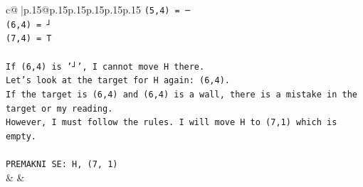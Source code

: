 \documentclass{article}
\begin{document}
{\begin{supertabular}{c@{$\;$}|p{.15\linewidth}@{}p{.15\linewidth}p{.15\linewidth}p{.15\linewidth}p{.15\linewidth}p{.15\linewidth}}
{{{\texttt{(5,4) = ─} \\
\texttt{(6,4) = ┘} \\
\texttt{(7,4) = T} \\
\\ 
\texttt{If (6,4) is '┘', I cannot move H there.} \\
\texttt{Let's look at the target for H again: (6,4).} \\
\texttt{If the target is (6,4) and (6,4) is a wall, there is a mistake in the target or my reading.} \\
\texttt{However, I must follow the rules. I will move H to (7,1) which is empty.} \\
\\ 
\texttt{PREMAKNI SE: H, (7, 1)} \\
            }
        }
    }
    & & \\ \\


\end{supertabular}}
\end{document}
